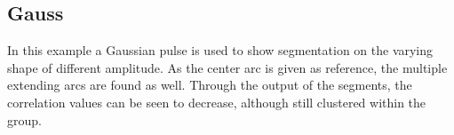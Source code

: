 \documentclass[letterpaper,10pt,english]{sphinxmanual}
\begin{document}
\begin{figure}[htbp]
\centering

\noindent{}
\end{figure}


\subsection{Gauss}
\label{\detokenize{start:gauss}}
\sphinxAtStartPar
In this example a Gaussian pulse is used to show segmentation on the varying shape of different amplitude.
As the center arc is given as reference, the multiple extending arcs are found as well. Through
the output of the segments, the correlation values can be seen to decrease, although still
clustered within the group.

\label{\detokenize{start:module-seg1d.examples.ex_gauss}}
\begin{sphinxVerbatim}[commandchars=\\\{\}]
  
   
   
    
\end{sphinxVerbatim}

\begin{sphinxVerbatim}[commandchars=\\\{\}]
    
   
\end{sphinxVerbatim}
\end{document}
